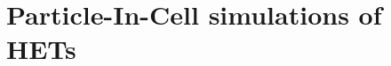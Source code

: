 
\chapter{Particle-In-Cell simulations of HETs}
\label{ch-1}

\begin{Chabstract}
  
\lipsum[1-2]

\end{Chabstract}

\minitoc


 



